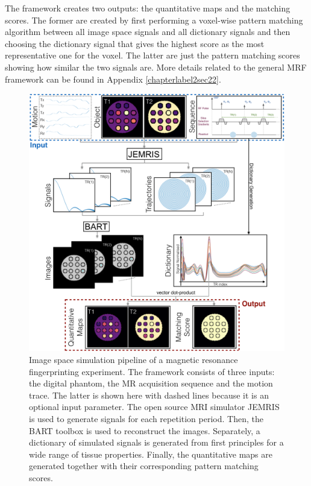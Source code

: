 \hfill

The framework creates two outputs: the quantitative maps and the matching scores.
The former are created by first performing a voxel-wise pattern matching algorithm between all image space signals and all dictionary signals and then choosing the dictionary signal that gives the highest score as the most representative one for the voxel.
The latter are just the pattern matching scores showing how similar the two signals are.
More details related to the general MRF framework can be found in Appendix \ref{chapterlabel2sec22}.

\begin{figure}[ht]
    \centering
    \includegraphics[angle=0,width=1\textwidth, keepaspectratio]{images/mrf/methodFramework}
    \caption{Image space simulation pipeline of a magnetic resonance fingerprinting experiment.
    The framework consists of three inputs: the digital phantom, the MR acquisition sequence and the motion trace. 
    The latter is shown here with dashed lines because it is an optional input parameter. 
    The open source MRI simulator JEMRIS is used to generate signals for each repetition period.
    Then, the BART toolbox is used to reconstruct the images.
    Separately, a dictionary of simulated signals is generated from first principles for a wide range of tissue properties.
    Finally, the quantitative maps are generated together with their corresponding pattern matching scores.}
    \label{fig:methodFramework}
\end{figure}

